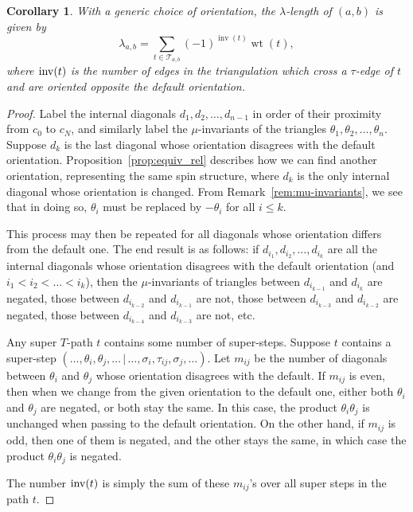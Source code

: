 \documentclass[pdftex]{sigma}
\numberwithin{equation}{section}
\newtheorem{Corollary}[Theorem]{Corollary}
\DeclareMathOperator{\wt}{wt}
\DeclareMathOperator{\inv}{inv}
\begin{document}
\begin{Corollary}\label{cor:main}
 With a generic choice of orientation, the $\lambda$-length of $(a,b)$ is given by
 \[ \lambda_{a,b} = \sum_{t\in\mathcal T_{a,b}}(-1)^{\inv(t)} \wt(t), \]
 where ${\rm inv}(t)$ is the number of edges in the triangulation which cross a $\tau$-edge of $t$ and are oriented opposite the default orientation.
\end{Corollary}
\begin {proof}
 Label the internal diagonals $d_1,d_2,\dots,d_{n-1}$ in order of their proximity from $c_0$ to $c_N$, and similarly label
 the $\mu$-invariants of the triangles $\theta_1,\theta_2,\dots,\theta_n$.
 Suppose $d_k$ is the last diagonal whose orientation disagrees with the default orientation. Proposition~\ref{prop:equiv_rel} describes how we can
 find another orientation, representing the same spin structure, where $d_k$ is the only internal diagonal whose orientation is changed.
 From Remark~\ref{rem:mu-invariants}, we see that in doing so, $\theta_i$ must be replaced by $-\theta_i$ for all $i \leq k$.

 This process may then be repeated for all diagonals whose orientation differs from the default one. The end result is as follows: if $d_{i_1},d_{i_2},\dots,d_{i_k}$
 are all the internal diagonals whose orientation disagrees with the default orientation (and $i_1 < i_2 < \dots < i_k$), then the $\mu$-invariants of
 triangles between $d_{i_{k-1}}$ and $d_{i_k}$ are negated, those between $d_{i_{k-2}}$ and $d_{i_{k-1}}$ are not, those between $d_{i_{k-3}}$ and
 $d_{i_{k-2}}$ are negated, those between $d_{i_{k-4}}$ and $d_{i_{k-3}}$ are not, etc.

 Any super $T$-path $t$ contains some number of super-steps. Suppose $t$ contains a super-step $(\dots,\theta_i,\theta_j,\dots\,|\,\dots,\sigma_i,\tau_{ij},\sigma_j,\dots)$.
 Let $m_{ij}$ be the number of diagonals between $\theta_i$ and $\theta_j$ whose orientation disagrees with the default. If $m_{ij}$ is even, then when we change from
 the given orientation to the default one, either both $\theta_i$ and $\theta_j$ are negated, or both stay the same. In this case, the product $\theta_i \theta_j$
 is unchanged when passing to the default orientation. On the other hand, if $m_{ij}$ is odd, then
 one of them is negated, and the other stays the same, in which case the product $\theta_i \theta_j$ is negated.

 The number ${\rm inv}(t)$ is simply the sum of these $m_{ij}$'s over all super steps in the path $t$.
\end {proof}
\end{document}
